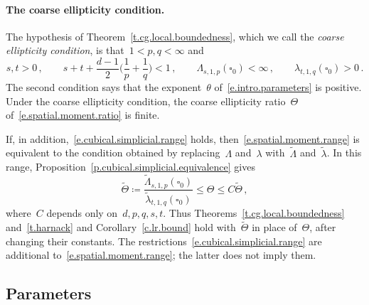 \documentclass[11pt,letterpaper]{article}
\numberwithin{equation}{section}
\theoremstyle{definition}
\newcommand{\cu}{\square}
\begin{document}
\paragraph{The coarse ellipticity condition.} The hypothesis of Theorem~\ref{t.cg.local.boundedness}, which we call the \emph{coarse ellipticity condition}, is that~$1<p,q<\infty$ and
\begin{equation}
	s,t>0\,,\qquad s+t+\frac{d-1}{2}\biggl(\frac1p+\frac1q\biggr)<1\,,\qquad \Lambda_{s,1,p}(\cu_0)<\infty\,,\qquad \lambda_{t,1,q}(\cu_0)>0\,.
	\label{e.spatial.moment.range}
\end{equation}
The second condition says that the exponent~$\theta$ of~\eqref{e.intro.parameters} is positive. Under the coarse ellipticity condition, the coarse ellipticity ratio~$\Theta$ of~\eqref{e.spatial.moment.ratio} is finite.

If, in addition,~\eqref{e.cubical.simplicial.range} holds, then~\eqref{e.spatial.moment.range} is equivalent to the condition obtained by replacing~$\Lambda$ and~$\lambda$ with~$\widetilde\Lambda$ and~$\widetilde\lambda$. In this range, Proposition~\ref{p.cubical.simplicial.equivalence} gives
\begin{equation}
	\widetilde\Theta\coloneqq\frac{\widetilde\Lambda_{s,1,p}(\cu_0)}{\widetilde\lambda_{t,1,q}(\cu_0)}\leq\Theta\leq C\widetilde\Theta\,,
	\label{e.cubical.simplicial.ratio}
\end{equation}
where~$C$ depends only on~$d,p,q,s,t$. Thus Theorems~\ref{t.cg.local.boundedness} and~\ref{t.harnack} and Corollary~\ref{c.lr.bound} hold with~$\widetilde\Theta$ in place of~$\Theta$, after changing their constants. The restrictions~\eqref{e.cubical.simplicial.range} are additional to~\eqref{e.spatial.moment.range}; the latter does not imply them.

\subsection{Parameters}
\end{document}
